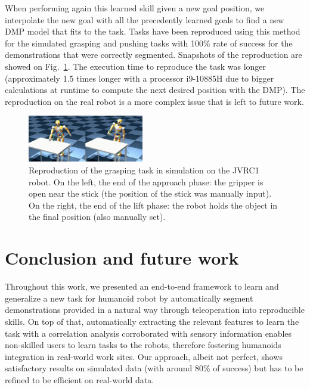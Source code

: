 \documentclass[conference]{IEEEtran}
\begin{document}
When performing again this learned skill given a new goal position, we interpolate the new goal with all the precedently learned goals to find a new DMP model that fits to the task. Tasks have been reproduced using this method for the simulated grasping and pushing tasks with 100\% rate of success for the demonstrations that were correctly segmented. Snapshots of the reproduction are showed on Fig.~\ref{fig:reproductionSim}. The execution time to reproduce the task was longer (approximately 1.5 times longer with a processor i9-10885H due to bigger calculations at runtime to compute the next desired position with the DMP). The reproduction on the real robot is a more complex issue that is left to future work. 

\begin{figure}[t]
  \centering
  \includegraphics[width=0.45\textwidth]{img/Reproduction.png}
  \caption{Reproduction of the grasping task in simulation on the JVRC1 robot. On the left, the end of the approach phase: the gripper is open near the stick (the position of the stick was manually input). On the right, the end of the lift phase: the robot holds the object in the final position (also manually set).}
  \label{fig:reproductionSim}
\end{figure}

\section{Conclusion and future work}\label{conclusion}

Throughout this work, we presented an end-to-end framework to learn and generalize a new task for humanoid robot by automatically segment demonstrations provided in a natural way through teleoperation into reproducible skills. 
On top of that, automatically extracting the relevant features to learn the task with a correlation analysis corroborated with sensory information enables non-skilled users to learn tasks to the robots, therefore fostering humanoids integration in real-world work sites. Our approach, albeit not perfect, shows satisfactory results on simulated data (with around 80\% of success) but has to be refined to be efficient on real-world data. \newline
\end{document}
